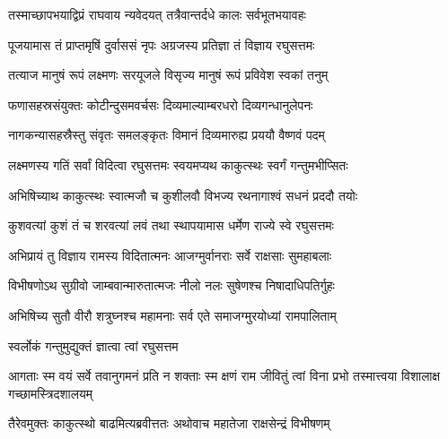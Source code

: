 


\twolineshloka
{तस्माच्छापभयाद्विप्रं राघवाय न्यवेदयत्}
{तत्रैवान्तर्दधे कालः सर्वभूतभयावहः}%

\twolineshloka
{पूजयामास तं प्राप्तमृषिं दुर्वाससं नृपः}
{अग्रजस्य प्रतिज्ञा तं विज्ञाय रघुसत्तमः}%

\twolineshloka
{तत्याज मानुषं रूपं लक्ष्मणः सरयूजले}
{विसृज्य मानुषं रूपं प्रविवेश स्वकां तनुम्}%

\twolineshloka
{फणासहस्रसंयुक्तः कोटीन्दुसमवर्चसः}
{दिव्यमाल्याम्बरधरो दिव्यगन्धानुलेपनः}%

\twolineshloka
{नागकन्यासहस्रैस्तु संवृतः समलङ्कृतः}
{विमानं दिव्यमारुह्य प्रययौ वैष्णवं पदम्}%

\twolineshloka
{लक्ष्मणस्य गतिं सर्वां विदित्वा रघुसत्तमः}
{स्वयमप्यथ काकुत्स्थः स्वर्गं गन्तुमभीप्सितः}%

\twolineshloka
{अभिषिच्याथ काकुत्स्थः स्वात्मजौ च कुशीलवौ}
{विभज्य रथनागाश्वं सधनं प्रददौ तयोः}%

\twolineshloka
{कुशवत्यां कुशं तं च शरवत्यां लवं तथा}
{स्थापयामास धर्मेण राज्ये स्वे रघुसत्तमः}%

\twolineshloka
{अभिप्रायं तु विज्ञाय रामस्य विदितात्मनः}
{आजग्मुर्वानराः सर्वे राक्षसाः सुमहाबलाः}%

\twolineshloka
{विभीषणोऽथ सुग्रीवो जाम्बवान्मारुतात्मजः}
{नीलो नलः सुषेणश्च निषादाधिपतिर्गुहः}%

\twolineshloka
{अभिषिच्य सुतौ वीरौ शत्रुघ्नश्च महामनाः}
{सर्व एते समाजग्मुरयोध्यां रामपालिताम्}%



\onelineshloka
{स्वर्लोकं गन्तुमुद्युक्तं ज्ञात्वा त्वां रघुसत्तम}%


\threelineshloka
{आगताः स्म वयं सर्वे तवानुगमनं प्रति}
{न शक्ताः स्म क्षणं राम जीवितुं त्वां विना प्रभो}
{तस्मात्त्वया विशालाक्ष गच्छामस्त्रिदशालयम्}%


\twolineshloka
{तैरेवमुक्तः काकुत्स्थो बाढमित्यब्रवीत्ततः}
{अथोवाच महातेजा राक्षसेन्द्रं विभीषणम्}%



